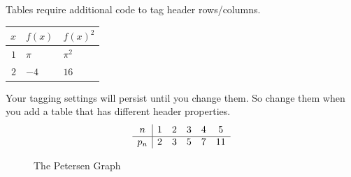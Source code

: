 \documentclass{article}
\begin{document}
Tables require additional code to tag header rows/columns.
\begin{center}
\begin{tabular}{r | l l}
 $x$ & $f(x)$ & $f(x)^2$ \\ \hline
 $1$ & $\pi$  & $\pi^2$  \\
 $2$ & $-4$   & $16$
\end{tabular}
\end{center}

Your tagging settings will persist until you change them.
So change them when you add a table that has different header properties.
\[
\begin{array}{c| ccccc}
n   & 1 & 2 & 3 & 4 & 5 \\
\hline
p_n & 2 & 3 & 5 & 7 & 11 \\
\end{array}
\]

\clearpage


\begin{figure}[h]
\centering
{}
\caption{The Petersen Graph}
\label{petersen}
\end{figure}

\end{document}
